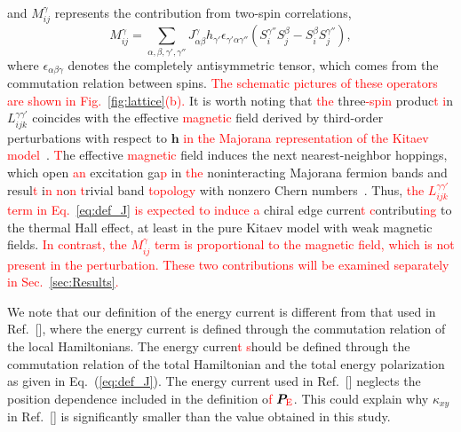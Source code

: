 \documentclass[twocolumn,superscriptaddress,showpacs, longbibliography, aps, prb]{revtex4-2}
\def\vec#1{\boldsymbol #1}
\newcommand{\red}[1]{\textcolor{red}{#1}}
\newcommand{\orange}[1]{\textcolor{orange}{#1}}
\begin{document}
and $M_{ij}^\gamma$ represents the contribution from two-spin correlations,
\begin{equation}
 M_{ij}^{\gamma} = \sum_{\alpha,\beta,\gamma',\gamma''} J_{\alpha\beta}^\gamma h_{\gamma'} \epsilon_{\gamma'\alpha\gamma''} \left(S_i^{\gamma''} S_j^{\beta} - S_i^{\beta} S_j^{\gamma''} \right),
 \label{eq:M}
\end{equation}
where $\epsilon_{\alpha\beta\gamma}$ %
denotes the completely antisymmetric tensor, which comes from the commutation relation between spins. 
\red{The schematic pictures of these operators are shown in Fig.~\ref{fig:lattice}(b).} 
It is worth noting that \red{the} three\red{-spin} produc\red{t %
i}n $L_{ijk}^{\gamma\gamma'}$ coincides with the effective \red{magnetic} field derived by third-order perturbations with respect to $\bm{h}$ \red{in the Majorana representation of the Kitaev model~\cite{Kitaev2006,NasuYM2017}}.
\red{T}he effective \red{magnetic} field %
induces the next nearest-neighbor hoppings, which open \red{an} excitation ga\red{p} %
in \red{the} noninteracting Majorana fermion bands and resul\red{t} %
i\red{n %
n}o\red{n%
t}rivial band %
\red{topology} with nonzero Chern numbers~\cite{Kitaev2006}.
Thus, \red{the $L_{ijk}^{\gamma\gamma'}$ term in Eq.~\eqref{eq:def_J} is expected to induce a} %
chiral edge curren\red{t %
c}ontribut\red{ing} %
to the thermal Hall effect, at least in the pure Kitaev model with weak magnetic fields.
\red{In contrast, the $M_{ij}^{\gamma}$ term is proportional to the magnetic field, which is not present in the perturbation. 
These two contributions will be examined separately in Sec.~\ref{sec:Results}.}

We note that our definition of the energy current is 
different from that used in Ref.~[], where the energy current is defined %
through the commutation relation %
of the local Hamiltonians.
The energy curren\red{t %
s}hould be defined %
through the commutation relation of the total Hamiltonian and the total energy polarization as given in
Eq.~(\ref{eq:def_J}). %
The energy current used in Ref.~[] 
neglects %
the position dependence included in the definition o\red{f} %
$\vec{P}_{\red{\mathrm{E}}}$.
This could explain why $\kappa_{xy}$ in Ref.~[] is significantly smaller than %
the value obtained %
in this study.
\end{document}
